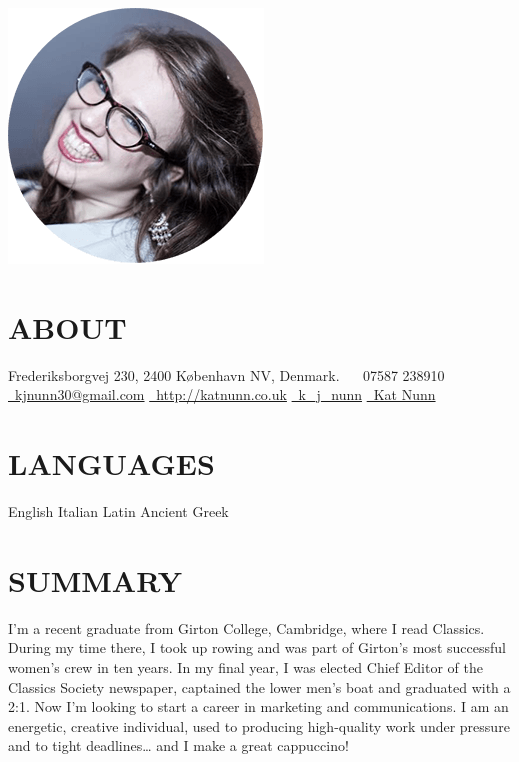 \documentclass[]{friggeri-cv}
\begin{document}
       {}

\begin{aside}
  \includegraphics[width=.66\textwidth]{../img/profile.png}
  \section{ABOUT}
    Frederiksborgvej 230,
    2400 København NV,
    Denmark.
    ~
    \faPhone~07587 238910
    \href{mailto:kjnunn30@gmail.com}{\faEnvelope~kjnunn30@gmail.com}
    \href{http://katnunn.co.uk}{\faGlobe~http://katnunn.co.uk}
    \href{https://twitter.com/k\_j\_nunn}{\faTwitter~k\_j\_nunn}
    \href{http://uk.linkedin.com/in/katnunn/}{\faLinkedin~Kat Nunn}
  \section{LANGUAGES}
    English
    Italian
    Latin
    Ancient Greek
\end{aside}

\section{SUMMARY}

I'm a recent graduate from Girton College, Cambridge, where I read Classics. During my time there, I took up rowing and was part of Girton's most successful women's crew in ten years. In my final year, I was elected Chief Editor of the Classics Society newspaper, captained the lower men's boat and graduated with a 2:1. Now I'm looking to start a career in marketing and communications. I am an energetic, creative individual, used to producing high-quality work under pressure and to tight deadlines… and I make a great cappuccino!
\end{document}
